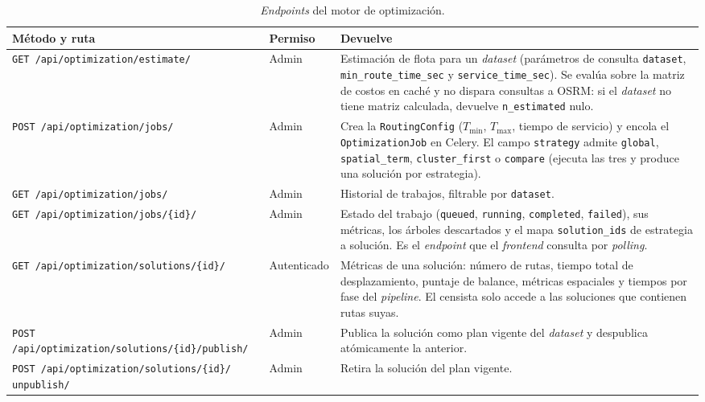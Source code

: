 \begin{table}[H]
  \centering
  \caption{\textit{Endpoints} del motor de optimización.}
  \label{tab:anexo_api_optimization}
  \small
  \begin{tabularx}{\textwidth}{@{}p{5.5cm} p{1.9cm} X@{}}
    \toprule
    Método y ruta &
      Permiso &
      Devuelve \\
    \midrule
    \texttt{GET \slash api\slash optimization\slash estimate\slash } &
      Admin &
      Estimación de flota para un \textit{dataset} (parámetros de consulta \texttt{dataset},
      \texttt{min\_route\_time\_sec} y \texttt{service\_time\_sec}). Se evalúa sobre la matriz
      de costos en caché y no dispara consultas a OSRM: si el \textit{dataset} no tiene matriz
      calculada, devuelve \texttt{n\_estimated} nulo. \\
    \texttt{POST \slash api\slash optimization\slash jobs\slash } &
      Admin &
      Crea la \texttt{RoutingConfig} ($T_{\min}$, $T_{\max}$, tiempo de servicio) y encola el
      \texttt{OptimizationJob} en Celery. El campo \texttt{strategy} admite \texttt{global},
      \texttt{spatial\_term}, \texttt{cluster\_first} o \texttt{compare} (ejecuta las tres y
      produce una solución por estrategia). \\
    \texttt{GET \slash api\slash optimization\slash jobs\slash } &
      Admin &
      Historial de trabajos, filtrable por \texttt{dataset}. \\
    \texttt{GET \slash api\slash optimization\slash jobs\slash \{id\}\slash } &
      Admin &
      Estado del trabajo (\texttt{queued}, \texttt{running}, \texttt{completed},
      \texttt{failed}), sus métricas, los árboles descartados y el mapa
      \texttt{solution\_ids} de estrategia a solución. Es el \textit{endpoint} que el
      \textit{frontend} consulta por \textit{polling}. \\
    \texttt{GET \slash api\slash optimization\slash solutions\slash \{id\}\slash } &
      Autenticado &
      Métricas de una solución: número de rutas, tiempo total de desplazamiento, puntaje de
      balance, métricas espaciales y tiempos por fase del \textit{pipeline}. El censista solo
      accede a las soluciones que contienen rutas suyas. \\
    \texttt{POST \slash api\slash optimization\slash solutions\slash \{id\}\slash publish\slash } &
      Admin &
      Publica la solución como plan vigente del \textit{dataset} y despublica atómicamente la
      anterior. \\
    \texttt{POST \slash api\slash optimization\slash solutions\slash \{id\}\slash
      unpublish\slash } &
      Admin &
      Retira la solución del plan vigente. \\
    \bottomrule
  \end{tabularx}
\end{table}


